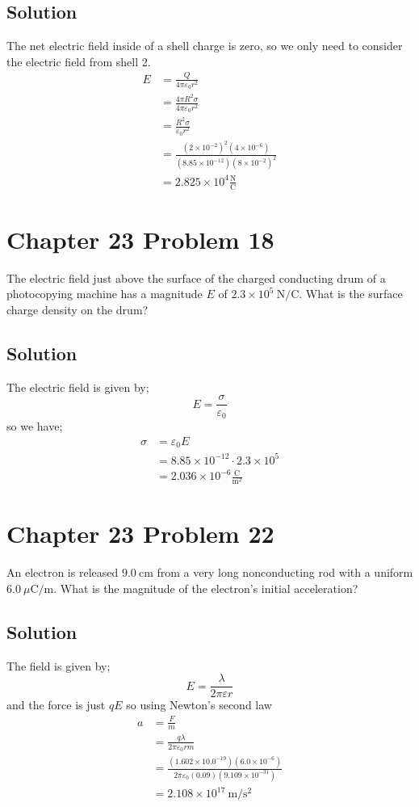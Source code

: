\documentclass{article}
\newcommand{\m}{\text{m}}
\newcommand{\centi}{\text{c}}
\newcommand{\s}{\text{s}}
\newcommand{\N}{\text{N}}
\newcommand{\C}{\text{C}}
\begin{document}
\subsection*{Solution}
The net electric field inside of a shell charge is zero, so we only need to consider the electric field from shell 2.
\begin{align*}
    E &= \frac{Q}{4\pi \varepsilon_0 r^2} \\
    &= \frac{4\pi R^2 \sigma}{4\pi \varepsilon_0 r^2}\\
    &= \frac{R^2 \sigma}{\varepsilon_0 r^2} \\
    &= \frac{(2 \times 10^{-2})^2 (4 \times 10^{-6})}{(8.85 \times 10^{-12}) (8 \times 10^{-2})^2} \\
    &= \boxed{2.825 \times 10^4 \frac{\N}{\C}}
\end{align*}

\section*{Chapter 23 Problem 18}
The electric field just above the surface of the charged conducting drum of a photocopying machine has a magnitude $E$ of $2.3 \times 10^5\ \N/\C$. What is the surface charge density on the drum?

\subsection*{Solution}
The electric field is given by;
\[
    E = \frac{\sigma}{\varepsilon_0}
\]
so we have;
\begin{align*}
    \sigma &= \varepsilon_0 E \\
    &= 8.85 \times 10^{-12} \cdot 2.3 \times 10^5 \\
    &= \boxed{2.036 \times 10^{-6} \frac{\C}{\m^2}}
\end{align*}

\section*{Chapter 23 Problem 22}
An electron is released $9.0\ \centi \m$ from a very long nonconducting rod with a uniform $6.0\ \mu\C/\m$. What is the magnitude of the electron's initial acceleration?

\subsection*{Solution}
The field is given by;
\[
	E = \frac{\lambda}{2\pi \varepsilon r}
\]
and the force is just $q E$ so using Newton's second law
\begin{align*}
	a &= \frac{F}{m} \\
	&= \frac{q\lambda}{2\pi \varepsilon_0 r m} \\
	&= \frac{\left(1.602 \times 10.0^{-19}\right)\left(6.0 \times 10^{-6}\right)}{2\pi \varepsilon_0 (0.09)\left(9.109 \times 10^{-31}\right)} \\
	&= \boxed{2.108\times10^{17}\ \m/\s^2}
\end{align*}
\end{document}
